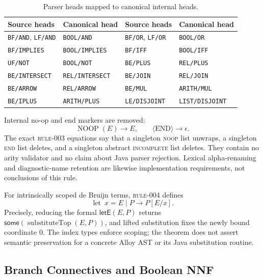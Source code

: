 \begin{table}[t]
\centering
\small
\caption{Parser heads mapped to canonical internal heads.}
\label{tab:opcode-aliases}
\setlength{\tabcolsep}{4pt}
\begin{tabular}{ll@{\qquad}ll}
\hline
Source heads & Canonical head & Source heads & Canonical head\\
\hline
\texttt{BF/AND}, \texttt{LF/AND} & \texttt{BOOL/AND} &
\texttt{BF/OR}, \texttt{LF/OR} & \texttt{BOOL/OR}\\
\texttt{BF/IMPLIES} & \texttt{BOOL/IMPLIES} &
\texttt{BF/IFF} & \texttt{BOOL/IFF}\\
\texttt{UF/NOT} & \texttt{BOOL/NOT} &
\texttt{BE/PLUS} & \texttt{REL/PLUS}\\
\texttt{BE/INTERSECT} & \texttt{REL/INTERSECT} &
\texttt{BE/JOIN} & \texttt{REL/JOIN}\\
\texttt{BE/ARROW} & \texttt{REL/ARROW} &
\texttt{BE/MUL} & \texttt{ARITH/MUL}\\
\texttt{BE/IPLUS} & \texttt{ARITH/PLUS} &
\texttt{LE/DISJOINT} & \texttt{LIST/DISJOINT}\\
\hline
\end{tabular}
\end{table}

Internal no-op and end markers are removed:
\[
  \operatorname{NOOP}(E)\longrightarrow E,
  \qquad
  \langle\mathrm{END}\rangle\longrightarrow\epsilon.
\]
The exact \textsc{rule-003} equations say that a singleton \textsc{noop} list
unwraps, a singleton \textsc{end} list deletes, and a singleton abstract
\textsc{incomplete} list deletes.  They contain no arity validator and no claim
about Java parser rejection.  Lexical alpha-renaming and diagnostic-name
retention are likewise implementation requirements, not conclusions of this
rule.

For intrinsically scoped de Bruijn terms, \textsc{rule-004} defines
\[
  \operatorname{let}\ x=E\mid P\longrightarrow P[E/x].
\]
Precisely, reducing the formal $\mathsf{letE}(E,P)$ returns
$\mathsf{some}(\operatorname{substituteTop}(E,P))$, and lifted substitution
fixes the newly bound coordinate $0$.  The index types enforce scoping; the
theorem does not assert semantic preservation for a concrete Alloy AST or its
Java substitution routine.

\subsection{Branch Connectives and Boolean NNF}

